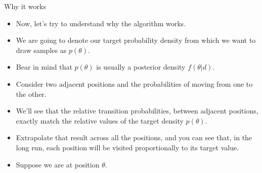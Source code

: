 \documentclass[handout]{beamer}
\begin{document}
\begin{frame}{Why it works}
\scriptsize{

\begin{itemize}
\item Now, let's try to understand why the algorithm works.

\item We are going to denote our target probability density from which we want to draw samples  as $p(\theta)$.

\item Bear in mind that $p(\theta)$ is usually a posterior density $f(\theta|d)$.

\item Consider two adjacent positions and the probabilities of moving from one to the other. 
\item We'll see that the relative transition probabilities, between adjacent positions, exactly match the relative values of the target density $p(\theta)$.

\item Extrapolate that result across all the positions, and you can see that, in the long run, each position will be visited proportionally to its target value.

\item Suppose we are at position $\theta$. 






\end{itemize}


} 
\end{frame}
\end{document}
